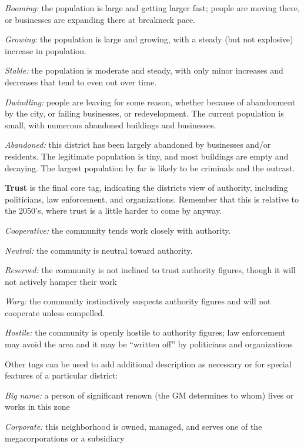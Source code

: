 \documentclass[oneside,10pt]{article}
\begin{document}
\begin{multicols}{2}
\begin{dent}
\textit{Booming:} the population is large and getting larger fast;
people are moving there, or businesses are expanding
there at breakneck pace.

\textit{Growing:} the population is large and growing, with a
steady (but not explosive) increase in population.

\textit{Stable:} the population is moderate and steady, with only
minor increases and decreases that tend to even out over
time.

\textit{Dwindling:} people are leaving for some reason, whether
because of abandonment by the city, or failing businesses,
or redevelopment. The current population is small, with
numerous abandoned buildings and businesses.

\textit{Abandoned:} this district has been largely abandoned by
businesses and/or residents. The legitimate population
is tiny, and most buildings are empty and decaying. The
largest population by far is likely to be criminals and the
outcast.
\end{dent}

\textbf{Trust} is the final core tag, indicating the districts view of authority, including politicians, law enforcement, and organizations. Remember that this is relative to the 2050’s, where
trust is a little harder to come by anyway.
\begin{dent}

\textit{Cooperative:} the community tends work closely with authority.

\textit{Neutral:} the community is neutral toward authority.

\textit{Reserved:} the community is not inclined to trust authority
figures, though it will not actively hamper their work

\textit{Wary:} the community instinctively suspects authority figures and will not cooperate unless compelled.

\textit{Hostile:} the community is openly hostile to authority figures; law enforcement may avoid the area and it may be
``written off'' by politicians and organizations
\end{dent}

Other tags can be used to add additional description as necessary or for special features of a particular district:
\begin{dent}

\textit{Big name:} a person of significant renown (the GM determines to whom) lives or works in this zone

\textit{Corporate:} this neighborhood is owned, managed, and
serves one of the megacorporations or a subsidiary


\end{dent}
\end{multicols}
\end{document}

